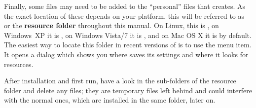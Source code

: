 Finally, some files may need to be added to the ``personal'' files that {\Tw} creates. As the exact location of these depends on your platform, this will be referred to as  or the \textbf{{\Tw} resource folder} throughout this manual. On Linux, this is , on Windows~XP it is , on Windows Vista/7 it is , and on Mac OS X it is  by default. The easiest way to locate this folder in recent versions of {\Tw} is to use the \submenu{} menu item. It opens a dialog which shows you where {\Tw} saves its settings and where it looks for resources.

After installation and first run, have a look in the sub-folders of the {\Tw} resource folder and delete any  files; they are temporary files left behind and could interfere with the normal ones, which are installed in the same folder, later on.
